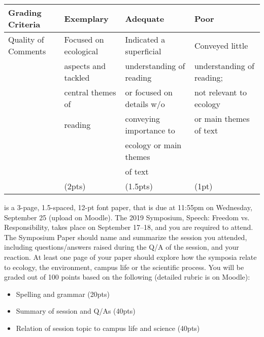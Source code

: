 \documentclass{tufte-handout}
\begin{document}
\begin{fullwidth}
\begin{tabular}{l l l l}
\\
\hline
\textbf{Grading Criteria} & \textbf{Exemplary} & \textbf{Adequate} & \textbf{Poor} \\
\hline
Quality of Comments & Focused on ecological & Indicated a superficial & Conveyed little \\
& aspects and tackled & understanding of reading & understanding of reading; \\
& central themes of & or focused on details w/o& not relevant to ecology \\
& reading &  conveying importance to & or main themes of text \\
& & ecology or main themes & \\
& & of text & \\
& (2pts) & (1.5pts) & (1pt) \\
\hline
\end{tabular}

 is a 3-page, 1.5-spaced, 12-pt font paper, that is due at 
11:55pm on Wednesday, September 25 (upload on Moodle). 											%
The 2019 Symposium, Speech: Freedom vs. Responsibility, 		 %
takes place on September 17--18, 													 %
and you are required to attend. The Symposium Paper should name and summarize the session you attended, including questions/answers raised during the Q/A of the session, and your reaction. At least one page of your paper should explore how the symposia relate to ecology, the environment, campus life or the scientific process. You will be graded out of 100 points based on the following (detailed rubric is on Moodle): 

\begin{itemize}
\item Spelling and grammar (20pts)
\item Summary of session and Q/As (40pts)
\item Relation of session topic to campus life and science (40pts)
\end{itemize}


\newpage


\end{fullwidth}
\end{document}
